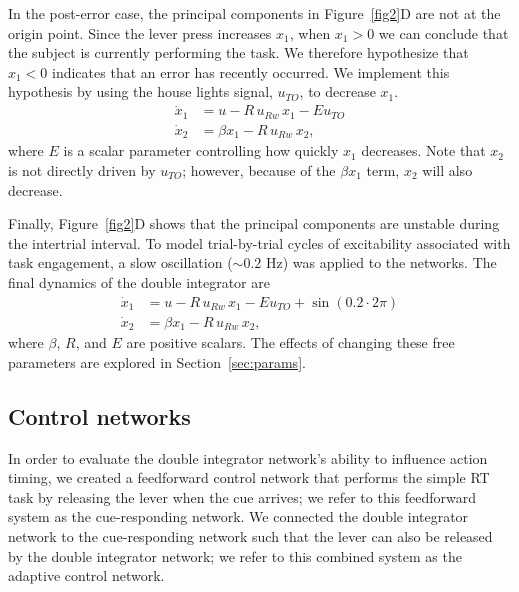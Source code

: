 \documentclass[11pt]{article}
\begin{document}
In the post-error case,
the principal components
in Figure~\ref{fig2}D are
not at the origin point.
Since the lever press increases $x_1$,
when $x_1 > 0$ we can conclude that
the subject is currently performing the task.
We therefore hypothesize that $x_1 < 0$
indicates that an error has recently occurred.
We implement this hypothesis
by using the house lights signal,
$u_{TO}$, to decrease $x_1$.
\begin{equation} \label{eq:dint}
  \begin{aligned}
    \dot{x}_1 &= u - R \, u_{Rw} \, x_1 - E u_{TO} \\
    \dot{x}_2 &= \beta x_1 - R \, u_{Rw} \, x_2,
  \end{aligned}
\end{equation}
where $E$ is a scalar parameter
controlling how quickly $x_1$ decreases.
Note that $x_2$ is not directly driven by $u_{TO}$;
however, because of the $\beta x_1$ term,
$x_2$ will also decrease.

Finally, Figure~\ref{fig2}D shows that
the principal components are unstable
during the intertrial interval.
To model trial-by-trial cycles of
excitability associated with task engagement,
a slow oscillation ($\sim0.2$ Hz)
was applied to the networks.
The final dynamics of the double integrator are
\begin{equation} \label{eq:dint-o}
  \begin{aligned}
    \dot{x}_1 &= u - R \, u_{Rw} \, x_1 - E u_{TO} + \sin(0.2 \cdot 2 \pi) \\
    \dot{x}_2 &= \beta x_1 - R \, u_{Rw} \, x_2,
  \end{aligned}
\end{equation}
where $\beta$, $R$, and $E$ are positive scalars.
The effects of changing these free parameters
are explored in Section~\ref{sec:params}.

\subsection{Control networks} \label{sec:control}

In order to evaluate the double integrator network's
ability to influence action timing,
we created a feedforward control network
that performs the simple RT task
by releasing the lever
when the cue arrives;
we refer to this feedforward system as the cue-responding network.
We connected the double integrator network
to the cue-responding network such that
the lever can also be released
by the double integrator network;
we refer to this combined system as the adaptive control network.
\end{document}
